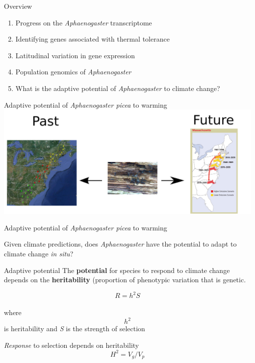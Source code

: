 \documentclass{beamer}
\begin{document}
\begin{frame}{Overview}
	\begin{enumerate}
  		\item Progress on the \textit{Aphaenogaster} transcriptome
	  	\item Identifying genes associated with thermal tolerance
		\item Latitudinal variation in gene expression
	  	\item Population genomics of \textit{Aphaenogaster}
  		\item<1-| alert@1> What is the adaptive potential of \textit{Aphaenogaster} to climate change?
	  \end{enumerate}
\end{frame}


\begin{frame}{Adaptive potential of \textit{Aphaenogaster picea} to warming}
	\includegraphics[width=\textwidth, height=\textheight, keepaspectratio]{aphaeno_predictive.png}
\end{frame}

\begin{frame}{Adaptive potential of \textit{Aphaenogaster picea} to warming}

	Given climate predictions, does \textit{Aphaenogaster} have the potential to adapt to climate change \emph{in situ}?	

	\begin{block}{Adaptive potential}
		The \textbf{potential} for species to respond to climate change depends on the \textbf{heritability} (proportion of phenotypic variation that is genetic. 

		$$R = h^2 S$$ \\

		where $$ h ^ 2 $$ is heritability and \textit{S} is the strength of selection 

		\textit{Response} to selection depends on heritability \\

	        $$ H^2 = V_g/V_p $$

	\end{block}
\end{frame}
\end{document}
